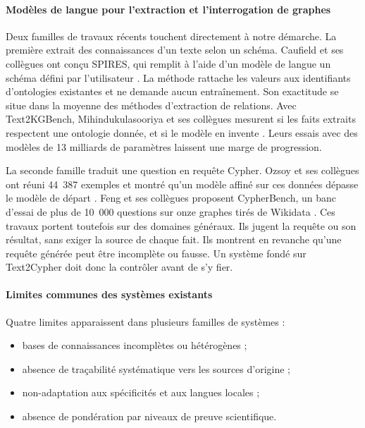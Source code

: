 \paragraph{Modèles de langue pour l'extraction et l'interrogation de graphes}
Deux familles de travaux récents touchent directement à notre démarche. La première extrait des connaissances d'un texte selon un schéma. Caufield et ses collègues ont conçu SPIRES, qui remplit à l'aide d'un modèle de langue un schéma défini par l'utilisateur \cite{caufield2024spires}. La méthode rattache les valeurs aux identifiants d'ontologies existantes et ne demande aucun entraînement. Son exactitude se situe dans la moyenne des méthodes d'extraction de relations. Avec Text2KGBench, Mihindukulasooriya et ses collègues mesurent si les faits extraits respectent une ontologie donnée, et si le modèle en invente \cite{mihindu2023text2kgbench}. Leurs essais avec des modèles de 13 milliards de paramètres laissent une marge de progression.

La seconde famille traduit une question en requête Cypher. Ozsoy et ses collègues ont réuni 44~387 exemples et montré qu'un modèle affiné sur ces données dépasse le modèle de départ \cite{ozsoy2024text2cypher}. Feng et ses collègues proposent CypherBench, un banc d'essai de plus de 10~000 questions sur onze graphes tirés de Wikidata \cite{feng2024cypherbench}. Ces travaux portent toutefois sur des domaines généraux. Ils jugent la requête ou son résultat, sans exiger la source de chaque fait. Ils montrent en revanche qu'une requête générée peut être incomplète ou fausse. Un système fondé sur Text2Cypher doit donc la contrôler avant de s'y fier.

\paragraph{Limites communes des systèmes existants}
Quatre limites apparaissent dans plusieurs familles de systèmes :
\begin{itemize}[label={$\bullet$}, leftmargin=1cm]
    \item bases de connaissances incomplètes ou hétérogènes ;
    \item absence de traçabilité systématique vers les sources d'origine ;
    \item non-adaptation aux spécificités et aux langues locales ;
    \item absence de pondération par niveaux de preuve scientifique.
\end{itemize}

